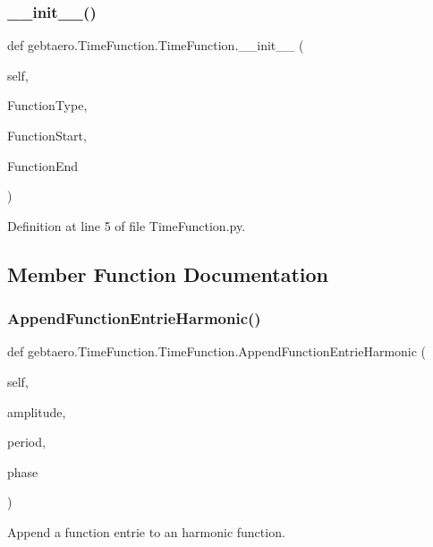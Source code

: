 \subsubsection{\texorpdfstring{\+\_\+\+\_\+init\+\_\+\+\_\+()}{\_\_init\_\_()}}
{\footnotesize\ttfamily def gebtaero.\+Time\+Function.\+Time\+Function.\+\_\+\+\_\+init\+\_\+\+\_\+ (\begin{DoxyParamCaption}\item[{}]{self,  }\item[{}]{Function\+Type,  }\item[{}]{Function\+Start,  }\item[{}]{Function\+End }\end{DoxyParamCaption})}



Definition at line 5 of file Time\+Function.\+py.



\subsection{Member Function Documentation}
\mbox{\label{classgebtaero_1_1_time_function_1_1_time_function_a8e4d81106458219357606a349486c2e6}} 
\subsubsection{\texorpdfstring{Append\+Function\+Entrie\+Harmonic()}{AppendFunctionEntrieHarmonic()}}
{\footnotesize\ttfamily def gebtaero.\+Time\+Function.\+Time\+Function.\+Append\+Function\+Entrie\+Harmonic (\begin{DoxyParamCaption}\item[{}]{self,  }\item[{}]{amplitude,  }\item[{}]{period,  }\item[{}]{phase }\end{DoxyParamCaption})}



Append a function entrie to an harmonic function. 


